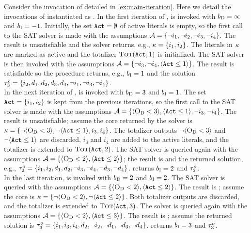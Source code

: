 \begin{example}\label{ex:msu}
  Consider the invocation of \algname{} detailed in \cref{ex:main-iteration}. 
  Here we detail the invocations of \Min{} instantiated as \msu{}. 
  In the first iteration of \algname{}, \msu{} is invoked with $b_{\text{D}} =\infty$ and $b_{\text{I}} = -1$.
  Initially, the set $\texttt{Act} = \emptyset$ of active literals is empty, so the first call to the SAT solver is made with the assumptions $\mathcal{A} =  \{ \lnot i_1, \allowbreak \lnot i_2, \allowbreak \lnot i_3, \allowbreak \lnot i_4\}$.
  The result is unsatisfiable and the solver returns, e.g., $\kappa = \{i_1, i_2\}$. 
  The literals in $\kappa$ are marked as active and the totalizer $\textsc{Tot}(\texttt{Act}, 1)$ is initialized.
  The SAT solver is then invoked with the assumptions $\mathcal{A} = \{ \lnot i_3, \lnot i_4, \langle \texttt{Act} \leq 1 \rangle\}$. 
  The result is satisfiable so the procedure returns, e.g., $b_{\text{I}} = 1$ and the solution $\tau^c_3 = \{i_2,\allowbreak d_1,\allowbreak d_2,\allowbreak d_3,\allowbreak d_4,\allowbreak \lnot i_1,\allowbreak \lnot i_3,\allowbreak \lnot i_4\}$. \\
  In the next iteration of \algname{}, \msu{} is invoked with $b_{\text{D}} = 3$ and $b_{\text{I}} = 1$.
  The set $\texttt{Act} = \{i_1, i_2\}$ is kept from the previous iterations, so the first call to the SAT solver is made with the assumptions $\mathcal{A} = \{ \langle \textsc{O}_{\text{D}} < 3 \rangle, \allowbreak \langle \texttt{Act} \leq 1 \rangle, \allowbreak \lnot i_3, \allowbreak \lnot i_4 \}$.
  The result is unsatisfiable;
  assume the core returned by the solver is $\kappa = \{ \lnot \langle \textsc{O}_{\text{D}} < 3 \rangle, \allowbreak \lnot \langle \texttt{Act} \leq 1 \rangle, \allowbreak i_3, \allowbreak i_4 \}$.
  The totalizer outputs $\lnot \langle \textsc{O}_{\text{D}} < 3 \rangle$ and $\lnot \langle \texttt{Act} \leq 1 \rangle$ are discarded, $i_3$ and $i_4$ are added to the active literals, and the totalizer is extended to $\textsc{Tot}(\texttt{Act}, 2)$.
  The SAT solver is queried again with the assumptions $\mathcal{A} = \{\langle \textsc{O}_{\text{D}} < 2 \rangle, \langle \texttt{Act} \leq 2 \rangle\}$;
  the result is \sat{} and the returned solution, e.g., $\tau^o_2 = \{i_1,\allowbreak i_2,\allowbreak d_1,\allowbreak d_2,\allowbreak \lnot i_3,\allowbreak \lnot i_4,\allowbreak \lnot d_3,\allowbreak \lnot d_4\}$.
  \msu{} returns $b_{\text{I}} = 2$ and $\tau^o_2$. \\
  In the last iteration, \msu{} is invoked with $b_{\text{D}} = 2$ and $b_{\text{I}} = 2$.
  The SAT solver is queried with the assumptions $\mathcal{A} = \{\langle \textsc{O}_{\text{D}} < 2 \rangle, \langle \texttt{Act} \leq 2 \rangle\}$.
  The result is \unsat{};
  assume the core is $\kappa = \{ \lnot \langle \textsc{O}_{\text{D}} < 2 \rangle, \lnot \langle \texttt{Act} \leq 2 \rangle \}$.
  Both totalizer outputs are discarded, and the totalizer is extended to $\textsc{Tot}(\texttt{Act}, 3)$.
  The solver is queried again with the assumptions $\mathcal{A} = \{\langle \textsc{O}_{\text{D}} < 2 \rangle, \langle \texttt{Act} \leq 3 \rangle\}$.
  The result is \sat{};
  assume the returned solution is $\tau^o_3 = \{i_1,\allowbreak i_3,\allowbreak i_4,\allowbreak d_2,\allowbreak \lnot i_2,\allowbreak \lnot d_1,\allowbreak \lnot d_3,\allowbreak \lnot d_4\}$.
  \msu{} returns $b_{\text{I}} = 3$ and $\tau^o_3$.
\end{example}

